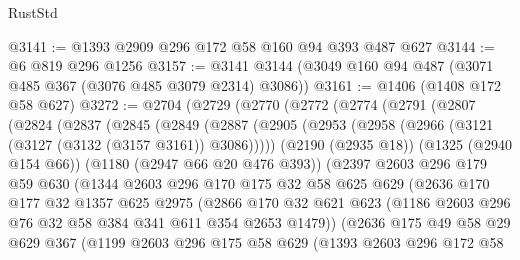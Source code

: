 \begin{lexlean}{RustStd}
\begin{coremodule}
{\begin{coremodule}
{{{{{{{{{@3141 := @1393 @2909 @296 @172 @58 @160 @94 @393 @487 @627
@3144 := @6 @819 @296 @1256
@3157 := @3141 @3144 (@3049 @160 @94 @487 (@3071 @485 @367 (@3076 @485 @3079 @2314) @3086))
@3161 := @1406 (@1408 @172 @58 @627)
@3272 := @2704
    (@2729
      (@2770
        (@2772
          (@2774
            (@2791
              (@2807
                (@2824
                  (@2837
                    (@2845
                      (@2849
                        (@2887
                          (@2905
                            (@2953 (@2958 (@2966 (@3121 (@3127 (@3132 (@3157 @3161)) @3086)))))
                            (@2190 (@2935 @18))
                            (@1325 (@2940 @154 @66))
                            (@1180 (@2947 @66 @20 @476 @393))
                            (@2397
                              @2603
                              @296
                              @179
                              @59
                              @630
                              (@1344
                                @2603
                                @296
                                @170
                                @175
                                @32
                                @58
                                @625
                                @629
                                (@2636
                                  @170
                                  @177
                                  @32
                                  @1357
                                  @625
                                  @2975
                                  (@2866
                                    @170
                                    @32
                                    @621
                                    @623
                                    (@1186 @2603 @296 @76 @32 @58 @384 @341 @611 @354 @2653 @1479))
                                  (@2636
                                    @175
                                    @49
                                    @58
                                    @29
                                    @629
                                    @367
                                    (@1199
                                      @2603
                                      @296
                                      @175
                                      @58
                                      @629
                                      (@1393
                                        @2603
                                        @296
                                        @172
                                        @58
}}}}}}}}}
\end{coremodule}}
\end{coremodule}
\end{lexlean}
